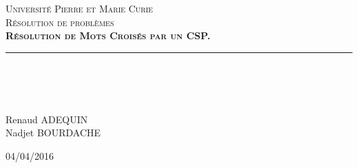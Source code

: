 \documentclass[a4paper,12pt]{report}
\newcommand{\HRule}{\rule{\linewidth}{0.5mm}}
\begin{document}
\begin{titlepage}
  \begin{sffamily}
  \begin{center}

    \textsc{ Université Pierre et Marie Curie \\[1cm] \huge Résolution de problèmes}\\[6cm]

    \textsc{\huge \bfseries Résolution de Mots Croisés par un CSP.}\\

    \HRule \\[0.4cm]

~~\\
~~\\
    \begin{minipage}{0.4\textwidth}
      \begin{center} \large
        Renaud \textsc{ADEQUIN}\\
        Nadjet \textsc{BOURDACHE}\\
      \end{center}
    \end{minipage}

    \vfill

    {\large 04/04/2016}

  \end{center}
  \end{sffamily}
\end{titlepage}
\end{document}
